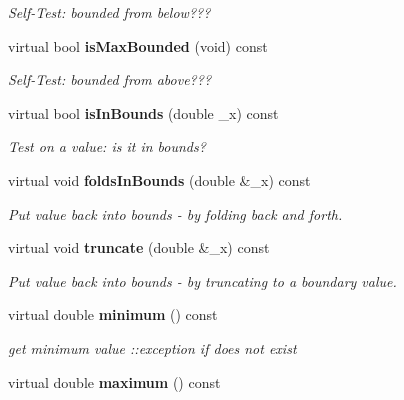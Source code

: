 \begin{CompactItemize}
\begin{CompactList}\small\item\em Self-Test: bounded from below??? \item\end{CompactList}\item 
virtual bool {\bf is\-Max\-Bounded} (void) const \label{classeo_general_real_bounds_a7}

\begin{CompactList}\small\item\em Self-Test: bounded from above??? \item\end{CompactList}\item 
virtual bool {\bf is\-In\-Bounds} (double \_\-x) const \label{classeo_general_real_bounds_a8}

\begin{CompactList}\small\item\em Test on a value: is it in bounds? \item\end{CompactList}\item 
virtual void {\bf folds\-In\-Bounds} (double \&\_\-x) const \label{classeo_general_real_bounds_a9}

\begin{CompactList}\small\item\em Put value back into bounds - by folding back and forth. \item\end{CompactList}\item 
virtual void {\bf truncate} (double \&\_\-x) const \label{classeo_general_real_bounds_a10}

\begin{CompactList}\small\item\em Put value back into bounds - by truncating to a boundary value. \item\end{CompactList}\item 
virtual double {\bf minimum} () const \label{classeo_general_real_bounds_a11}

\begin{CompactList}\small\item\em get minimum value ::exception if does not exist \item\end{CompactList}\item 
virtual double {\bf maximum} () const \label{classeo_general_real_bounds_a12}


\end{CompactItemize}
